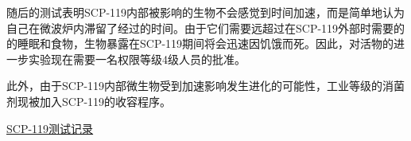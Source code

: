 随后的测试表明SCP-119内部被影响的生物不会感觉到时间加速，而是简单地认为自己在微波炉内滞留了经过的时间。由于它们需要远超过在SCP-119外部时需要的的睡眠和食物，生物暴露在SCP-119期间将会迅速因饥饿而死。因此，对活物的进一步实验现在需要一名权限等级4级人员的批准。

此外，由于SCP-119内部微生物受到加速影响发生进化的可能性，工业等级的消菌剂现被加入SCP-119的收容程序。

\hyperref[sec:DOC-test-log-for-scp-119]{SCP-119测试记录}

\newpage


